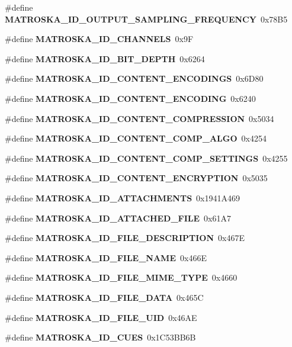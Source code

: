 \begin{DoxyCompactItemize}
\item 
\#define {\bf M\+A\+T\+R\+O\+S\+K\+A\+\_\+\+I\+D\+\_\+\+O\+U\+T\+P\+U\+T\+\_\+\+S\+A\+M\+P\+L\+I\+N\+G\+\_\+\+F\+R\+E\+Q\+U\+E\+N\+C\+Y}~0x78\+B5
\item 
\#define {\bf M\+A\+T\+R\+O\+S\+K\+A\+\_\+\+I\+D\+\_\+\+C\+H\+A\+N\+N\+E\+L\+S}~0x9\+F
\item 
\#define {\bf M\+A\+T\+R\+O\+S\+K\+A\+\_\+\+I\+D\+\_\+\+B\+I\+T\+\_\+\+D\+E\+P\+T\+H}~0x6264
\item 
\#define {\bf M\+A\+T\+R\+O\+S\+K\+A\+\_\+\+I\+D\+\_\+\+C\+O\+N\+T\+E\+N\+T\+\_\+\+E\+N\+C\+O\+D\+I\+N\+G\+S}~0x6\+D80
\item 
\#define {\bf M\+A\+T\+R\+O\+S\+K\+A\+\_\+\+I\+D\+\_\+\+C\+O\+N\+T\+E\+N\+T\+\_\+\+E\+N\+C\+O\+D\+I\+N\+G}~0x6240
\item 
\#define {\bf M\+A\+T\+R\+O\+S\+K\+A\+\_\+\+I\+D\+\_\+\+C\+O\+N\+T\+E\+N\+T\+\_\+\+C\+O\+M\+P\+R\+E\+S\+S\+I\+O\+N}~0x5034
\item 
\#define {\bf M\+A\+T\+R\+O\+S\+K\+A\+\_\+\+I\+D\+\_\+\+C\+O\+N\+T\+E\+N\+T\+\_\+\+C\+O\+M\+P\+\_\+\+A\+L\+G\+O}~0x4254
\item 
\#define {\bf M\+A\+T\+R\+O\+S\+K\+A\+\_\+\+I\+D\+\_\+\+C\+O\+N\+T\+E\+N\+T\+\_\+\+C\+O\+M\+P\+\_\+\+S\+E\+T\+T\+I\+N\+G\+S}~0x4255
\item 
\#define {\bf M\+A\+T\+R\+O\+S\+K\+A\+\_\+\+I\+D\+\_\+\+C\+O\+N\+T\+E\+N\+T\+\_\+\+E\+N\+C\+R\+Y\+P\+T\+I\+O\+N}~0x5035
\item 
\#define {\bf M\+A\+T\+R\+O\+S\+K\+A\+\_\+\+I\+D\+\_\+\+A\+T\+T\+A\+C\+H\+M\+E\+N\+T\+S}~0x1941\+A469
\item 
\#define {\bf M\+A\+T\+R\+O\+S\+K\+A\+\_\+\+I\+D\+\_\+\+A\+T\+T\+A\+C\+H\+E\+D\+\_\+\+F\+I\+L\+E}~0x61\+A7
\item 
\#define {\bf M\+A\+T\+R\+O\+S\+K\+A\+\_\+\+I\+D\+\_\+\+F\+I\+L\+E\+\_\+\+D\+E\+S\+C\+R\+I\+P\+T\+I\+O\+N}~0x467\+E
\item 
\#define {\bf M\+A\+T\+R\+O\+S\+K\+A\+\_\+\+I\+D\+\_\+\+F\+I\+L\+E\+\_\+\+N\+A\+M\+E}~0x466\+E
\item 
\#define {\bf M\+A\+T\+R\+O\+S\+K\+A\+\_\+\+I\+D\+\_\+\+F\+I\+L\+E\+\_\+\+M\+I\+M\+E\+\_\+\+T\+Y\+P\+E}~0x4660
\item 
\#define {\bf M\+A\+T\+R\+O\+S\+K\+A\+\_\+\+I\+D\+\_\+\+F\+I\+L\+E\+\_\+\+D\+A\+T\+A}~0x465\+C
\item 
\#define {\bf M\+A\+T\+R\+O\+S\+K\+A\+\_\+\+I\+D\+\_\+\+F\+I\+L\+E\+\_\+\+U\+I\+D}~0x46\+A\+E
\item 
\#define {\bf M\+A\+T\+R\+O\+S\+K\+A\+\_\+\+I\+D\+\_\+\+C\+U\+E\+S}~0x1\+C53\+B\+B6\+B

\end{DoxyCompactItemize}
